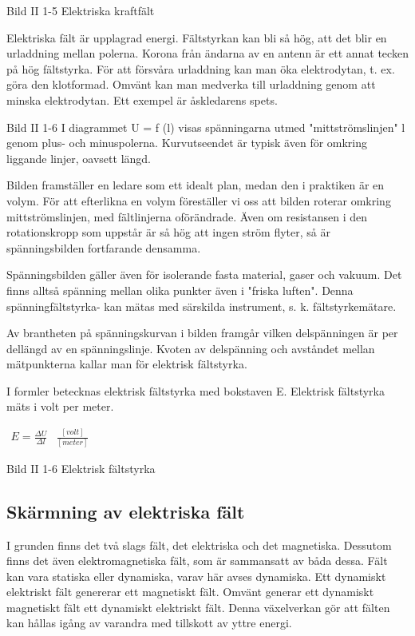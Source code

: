 \documentclass[a4paper,twoside,twocolumn,openright]{book}
\begin{document}
Bild II 1-5 Elektriska kraftfält

Elektriska fält är upplagrad energi. Fältstyrkan kan bli så hög, att det blir en
urladdning mellan polerna. Korona från ändarna av en antenn är ett annat tecken på hög
fältstyrka. För att försvåra urladdning kan man öka elektrodytan, t. ex. göra den
klotformad. Omvänt kan man medverka till urladdning genom att minska elektrodytan.
Ett exempel är åskledarens spets.

Bild II 1-6
I diagrammet U = f (l) visas spänningarna utmed "mittströmslinjen" l genom plus- och
minuspolerna. Kurvutseendet är typisk även för omkring liggande linjer, oavsett längd.

Bilden framställer en ledare som ett idealt plan, medan den i praktiken är en volym.
För att efterlikna en volym föreställer vi oss att bilden roterar omkring
mittströmslinjen, med fältlinjerna oförändrade. Även om resistansen i den rotationskropp
som uppstår är så hög att ingen ström flyter, så är spänningsbilden fortfarande densamma.

Spänningsbilden gäller även för isolerande fasta material, gaser och vakuum.
Det finns alltså spänning mellan olika punkter även i "friska luften". Denna
spänningfältstyrka- kan mätas med särskilda instrument, s. k. fältstyrkemätare.

Av brantheten på spänningskurvan i bilden framgår vilken delspänningen är per dellängd av
en spänningslinje. Kvoten av delspänning och avståndet mellan mätpunkterna kallar man för
elektrisk fältstyrka.

I formler betecknas elektrisk fältstyrka med bokstaven E.
Elektrisk fältstyrka mäts i volt per meter.

$
\begin{array}{cc}
E=\frac{\Delta U}{\Delta l} & \frac{[volt]}{[meter]}
\end{array}
$

Bild II 1-6 Elektrisk fältstyrka

\subsection{Skärmning av elektriska fält}

I grunden finns det två slags fält, det elektriska och det magnetiska. Dessutom finns det
även elektromagnetiska fält, som är sammansatt av båda dessa. Fält kan vara statiska
eller dynamiska, varav här avses dynamiska. Ett dynamiskt elektriskt fält genererar ett
magnetiskt fält. Omvänt generar ett dynamiskt magnetiskt fält ett dynamiskt elektriskt
fält. Denna växelverkan gör att fälten kan hållas igång av varandra med tillskott av
yttre energi.
\end{document}
